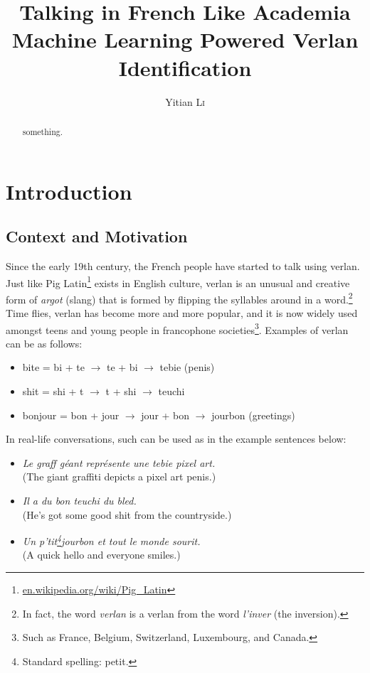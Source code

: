 \documentclass[12pt]{article}
\title{Talking in French Like Academia\\\large Machine Learning Powered Verlan Identification}
\author{Yitian \textsc{Li}}
\begin{document}
\maketitle

\begin{abstract}
something.
\end{abstract}

\section{Introduction}
\subsection{Context and Motivation}

Since the early 19th century, the French people have started to talk using verlan. Just like Pig Latin\footnote{\url{en.wikipedia.org/wiki/Pig_Latin}} exists in English culture, verlan is an unusual and creative form of \textit{argot} (slang) that is formed by flipping the syllables around in a word.\footnote{In fact, the word \textit{verlan} is a verlan from the word \textit{l'inver} (the inversion).}\cite{rajabov2025,bach2018} 
Time flies, verlan has become more and more popular, and it is now widely used amongst teens and young people in francophone societies\footnote{Such as France, Belgium, Switzerland, Luxembourg, and Canada.}\cite{evolutionverlan}. Examples of verlan can be as follows:

\begin{flushleft}
\small
\begin{itemize}
  \item bite = bi + te \(\rightarrow\) te + bi \(\rightarrow\) tebie (penis)
  \item shit = shi + t \(\rightarrow\) t + shi \(\rightarrow\) teuchi\cite{evolutionverlan}
  \item bonjour = bon + jour \(\rightarrow\) jour + bon \(\rightarrow\) jourbon (greetings)
\end{itemize}
\end{flushleft}

\noindent In real-life conversations, such can be used as in the example sentences below:

\begin{flushleft}
\small
\begin{itemize}
  \item \textit{Le graff géant représente une tebie pixel art.}\\(The giant graffiti depicts a pixel art penis.)
  \item \textit{Il a du bon teuchi du bled.}\\(He's got some good shit from the countryside.)
  \item \textit{Un p'tit\footnote{Standard spelling: petit.}jourbon et tout le monde sourit.}\\(A quick hello and everyone smiles.)
\end{itemize}
\end{flushleft}
\end{document}
